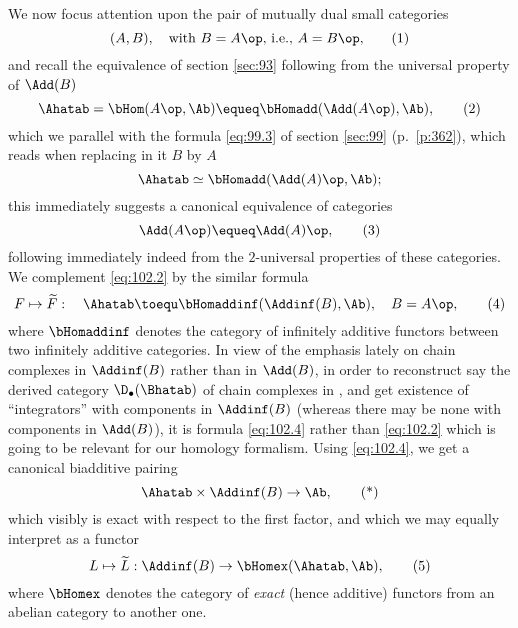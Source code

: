 \label{sec:102}%
We now focus attention upon the pair of mutually dual small categories
\begin{equation}
  \label{eq:102.1}
  (A,B), \quad\text{with $B=A\op$, i.e., $A=B\op$,}\tag{1}
\end{equation}
and recall the equivalence of section \ref{sec:93} following from the
universal property of $\Add(B)$
\begin{equation}
  \label{eq:102.2}
  \Ahatab = \bHom(A\op,\Ab) \equeq \bHomadd(\Add(A\op),\Ab),\tag{2}
\end{equation}
which we parallel with the formula \eqref{eq:99.3} of section
\ref{sec:99} (p.\ \ref{p:362}), which reads when replacing in it $B$
by $A$
\[\Ahatab\simeq\bHomadd(\Add(A)\op,\Ab)\text{;}\]
this immediately suggests a canonical equivalence of categories
\begin{equation}
  \label{eq:102.3}
  \Add(A\op)\equeq \Add(A)\op,\tag{3}
\end{equation}
following immediately indeed from the $2$-universal properties of
these categories. We complement \eqref{eq:102.2} by the similar
formula
\begin{equation}
  \label{eq:102.4}
  F\mapsto \widetilde F: \quad
  \Ahatab\toequ\bHomaddinf(\Addinf(B),\Ab), \quad B=A\op,\tag{4}
\end{equation}
where $\bHomaddinf$ denotes the category of infinitely additive
functors between two infinitely additive categories. In view of the
emphasis lately on chain complexes in $\Addinf(B)$ rather than in
$\Add(B)$, in order to reconstruct say the derived category
$\D_\bullet(\Bhatab)$ of chain complexes in \Bhatab, and get existence
of ``integrators'' with components in $\Addinf(B)$ (whereas there may
be none with components in $\Add(B)$), it is formula \eqref{eq:102.4}
rather than \eqref{eq:102.2} which is going to be relevant for our
homology formalism. Using \eqref{eq:102.4}, we get a canonical
biadditive pairing
\begin{equation}
  \label{eq:102.star}
  \Ahatab \times \Addinf(B) \to \Ab,\tag{*}
\end{equation}
which visibly is exact with respect to the first factor, and which we
may equally interpret as a functor
\begin{equation}
  \label{eq:102.5}
  L\mapsto \widetilde L: \Addinf(B) \to \bHomex(\Ahatab,\Ab),\tag{5}
\end{equation}
where $\bHomex$ denotes the category of \emph{exact} (hence additive)
functors from an abelian category to another one.

